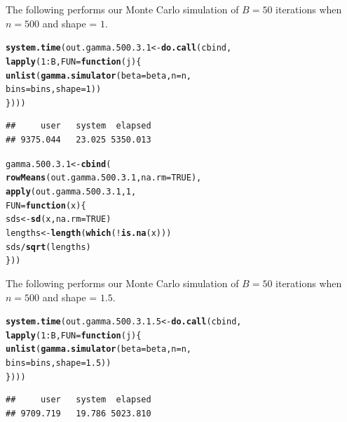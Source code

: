 \documentclass[11pt]{article}\usepackage[]{graphicx}\usepackage[]{color}
\makeatletter
\newcommand{\hlnum}[1]{\textcolor[rgb]{0.686,0.059,0.569}{#1}}%
\newcommand{\hlopt}[1]{\textcolor[rgb]{0,0,0}{#1}}%
\newcommand{\hlstd}[1]{\textcolor[rgb]{0.345,0.345,0.345}{#1}}%
\newcommand{\hlkwa}[1]{\textcolor[rgb]{0.161,0.373,0.58}{\textbf{#1}}}%
\newcommand{\hlkwb}[1]{\textcolor[rgb]{0.69,0.353,0.396}{#1}}%
\newcommand{\hlkwc}[1]{\textcolor[rgb]{0.333,0.667,0.333}{#1}}%
\newcommand{\hlkwd}[1]{\textcolor[rgb]{0.737,0.353,0.396}{\textbf{#1}}}%
\newenvironment{kframe}{%
 \def\at@end@of@kframe{}%
 \ifinner\ifhmode%
  \def\at@end@of@kframe{\end{minipage}}%
  \begin{minipage}{\columnwidth}%
 \fi\fi%
 \def\FrameCommand##1{\hskip\@totalleftmargin \hskip-\fboxsep
 \colorbox{shadecolor}{##1}\hskip-\fboxsep
     \hskip-\linewidth \hskip-\@totalleftmargin \hskip\columnwidth}%
 \MakeFramed {\advance\hsize-\width
   \@totalleftmargin\z@ \linewidth\hsize
   \@setminipage}}%
 {\par\unskip\endMakeFramed%
 \at@end@of@kframe}
\newenvironment{knitrout}{}{} %
\makeatother
\begin{document}
The following performs our Monte Carlo simulation of $B = 50$ iterations 
when $n = 500$ and shape = $1$.

\begin{knitrout}
\color{fgcolor}\begin{kframe}
\begin{alltt}
\hlkwd{system.time}\hlstd{(out.gamma.500.3.1} \hlkwb{<-} \hlkwd{do.call}\hlstd{(cbind,}
  \hlkwd{lapply}\hlstd{(}\hlnum{1}\hlopt{:}\hlstd{B,} \hlkwc{FUN} \hlstd{=} \hlkwa{function}\hlstd{(}\hlkwc{j}\hlstd{)\{}
    \hlkwd{unlist}\hlstd{(}\hlkwd{gamma.simulator}\hlstd{(}\hlkwc{beta} \hlstd{= beta,} \hlkwc{n} \hlstd{= n,}
      \hlkwc{bins} \hlstd{= bins,} \hlkwc{shape} \hlstd{=} \hlnum{1}\hlstd{))}
\hlstd{\})))}
\end{alltt}
\begin{verbatim}
##     user   system  elapsed 
## 9375.044   23.025 5350.013
\end{verbatim}
\end{kframe}
\end{knitrout}

\begin{knitrout}
\color{fgcolor}\begin{kframe}
\begin{alltt}
\hlstd{gamma.500.3.1} \hlkwb{<-} \hlkwd{cbind}\hlstd{(}
  \hlkwd{rowMeans}\hlstd{(out.gamma.500.3.1,} \hlkwc{na.rm} \hlstd{=} \hlnum{TRUE}\hlstd{),}
  \hlkwd{apply}\hlstd{(out.gamma.500.3.1,} \hlnum{1}\hlstd{,}
  \hlkwc{FUN} \hlstd{=} \hlkwa{function}\hlstd{(}\hlkwc{x}\hlstd{)\{}
    \hlstd{sds} \hlkwb{<-} \hlkwd{sd}\hlstd{(x,} \hlkwc{na.rm} \hlstd{=} \hlnum{TRUE}\hlstd{)}
    \hlstd{lengths} \hlkwb{<-} \hlkwd{length}\hlstd{(}\hlkwd{which}\hlstd{(}\hlopt{!}\hlkwd{is.na}\hlstd{(x)))}
    \hlstd{sds} \hlopt{/} \hlkwd{sqrt}\hlstd{(lengths)}
  \hlstd{\}))}
\end{alltt}
\end{kframe}
\end{knitrout}

The following performs our Monte Carlo simulation of $B = 50$ iterations 
when $n = 500$ and shape = $1.5$.

\begin{knitrout}
\color{fgcolor}\begin{kframe}
\begin{alltt}
\hlkwd{system.time}\hlstd{(out.gamma.500.3.1.5} \hlkwb{<-} \hlkwd{do.call}\hlstd{(cbind,}
  \hlkwd{lapply}\hlstd{(}\hlnum{1}\hlopt{:}\hlstd{B,} \hlkwc{FUN} \hlstd{=} \hlkwa{function}\hlstd{(}\hlkwc{j}\hlstd{)\{}
    \hlkwd{unlist}\hlstd{(}\hlkwd{gamma.simulator}\hlstd{(}\hlkwc{beta} \hlstd{= beta,} \hlkwc{n} \hlstd{= n,}
      \hlkwc{bins} \hlstd{= bins,} \hlkwc{shape} \hlstd{=} \hlnum{1.5}\hlstd{))}
\hlstd{\})))}
\end{alltt}
\begin{verbatim}
##     user   system  elapsed 
## 9709.719   19.786 5023.810
\end{verbatim}
\end{kframe}
\end{knitrout}
\end{document}
